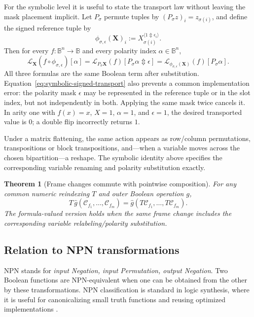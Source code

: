 \documentclass[11pt]{article}
\newtheorem{theorem}{Theorem}[section]
\theoremstyle{definition}
\theoremstyle{remark}
\newcommand{\B}{\mathbb B}
\newcommand{\cC}{\mathcal C}
\newcommand{\xor}{\mathbin{\Updownarrow}}
\begin{document}
For the symbolic level it is useful to state the transport law without leaving the mask placement implicit.  Let $P_\sigma$ permute tuples by $(P_\sigma z)_i=z_{\sigma(i)}$, and define the signed reference tuple by
\[
 \phi_{\sigma,\epsilon}(\mathbf X)_i
 :=X_{\sigma(i)}^{\langle 1\xor\epsilon_i\rangle}.
\]
Then for every $f:\B^n\to\B$ and every polarity index $\alpha\in\B^n$,
\begin{equation}
 \boxed{
 \mathcal L_{\mathbf X}(f\circ\phi_{\sigma,\epsilon})[\alpha]
 =\mathcal L_{P_\sigma\mathbf X}(f)[P_\sigma\alpha\xor\epsilon]
 =\mathcal L_{\phi_{\sigma,\epsilon}(\mathbf X)}(f)[P_\sigma\alpha].}
 \label{eq:symbolic-signed-transport}
\end{equation}
All three formulas are the same Boolean term after substitution.  Equation~\eqref{eq:symbolic-signed-transport} also prevents a common implementation error: the polarity mask $\epsilon$ may be represented in the reference tuple or in the slot index, but not independently in both.  Applying the same mask twice cancels it.  In arity one with $f(x)=x$, $X=1$, $\alpha=1$, and $\epsilon=1$, the desired transported value is $0$; a double flip incorrectly returns $1$.

Under a matrix flattening, the same action appears as row/column permutations, transpositions or block transpositions, and---when a variable moves across the chosen bipartition---a reshape.  The symbolic identity above specifies the corresponding variable renaming and polarity substitution exactly.

\begin{theorem}[Frame changes commute with pointwise composition]
For any common numeric reindexing $T$ and outer Boolean operation $g$,
\begin{equation}
 T\,\widehat g(\cC_{f_1},\ldots,\cC_{f_m})
 =\widehat g(T\cC_{f_1},\ldots,T\cC_{f_m}).
 \label{eq:framecommutes}
\end{equation}
The formula-valued version holds when the same frame change includes the corresponding variable relabeling/polarity substitution.
\end{theorem}

\subsection{Relation to NPN transformations}

NPN stands for \emph{input Negation, input Permutation, output Negation}.  Two Boolean functions are NPN-equivalent when one can be obtained from the other by these transformations.  NPN classification is standard in logic synthesis, where it is useful for canonicalizing small truth functions and reusing optimized implementations \cite{Mishchenko2006,Zhou2019}.
\end{document}
